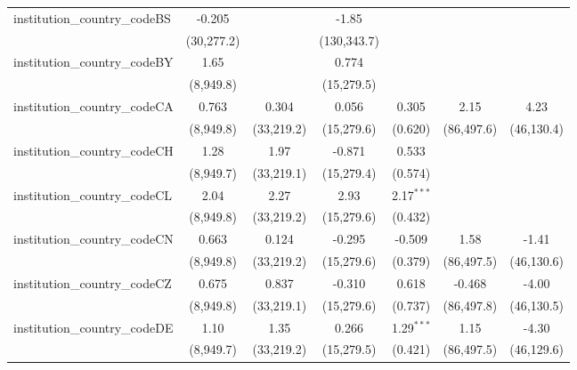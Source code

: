 \begin{tabular}{lcccccc}
   institution\_country\_codeBS          & -0.205        &               & -1.85         &               &              &   \\   
                                         & (30,277.2)    &               & (130,343.7)   &               &              &   \\   
   institution\_country\_codeBY          & 1.65          &               & 0.774         &               &              &   \\   
                                         & (8,949.8)     &               & (15,279.5)    &               &              &   \\   
   institution\_country\_codeCA          & 0.763         & 0.304         & 0.056         & 0.305         & 2.15         & 4.23\\   
                                         & (8,949.8)     & (33,219.2)    & (15,279.6)    & (0.620)       & (86,497.6)   & (46,130.4)\\   
   institution\_country\_codeCH          & 1.28          & 1.97          & -0.871        & 0.533         &              &   \\   
                                         & (8,949.7)     & (33,219.1)    & (15,279.4)    & (0.574)       &              &   \\   
   institution\_country\_codeCL          & 2.04          & 2.27          & 2.93          & 2.17$^{***}$  &              &   \\   
                                         & (8,949.8)     & (33,219.2)    & (15,279.6)    & (0.432)       &              &   \\   
   institution\_country\_codeCN          & 0.663         & 0.124         & -0.295        & -0.509        & 1.58         & -1.41\\   
                                         & (8,949.8)     & (33,219.2)    & (15,279.6)    & (0.379)       & (86,497.5)   & (46,130.6)\\   
   institution\_country\_codeCZ          & 0.675         & 0.837         & -0.310        & 0.618         & -0.468       & -4.00\\   
                                         & (8,949.8)     & (33,219.1)    & (15,279.6)    & (0.737)       & (86,497.8)   & (46,130.5)\\   
   institution\_country\_codeDE          & 1.10          & 1.35          & 0.266         & 1.29$^{***}$  & 1.15         & -4.30\\   
                                         & (8,949.7)     & (33,219.2)    & (15,279.5)    & (0.421)       & (86,497.5)   & (46,129.6)\\   

\end{tabular}
